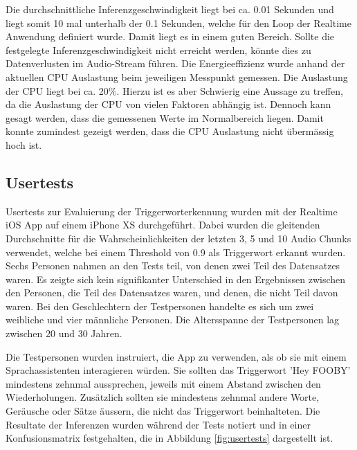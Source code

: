 \documentclass[11pt,a4paper]{article}
\begin{document}
\noindent \newline
Die durchschnittliche Inferenzgeschwindigkeit liegt bei ca. 0.01 Sekunden und liegt somit 10 mal
unterhalb der 0.1 Sekunden, welche für den Loop der Realtime Anwendung definiert wurde. Damit liegt 
es in einem guten Bereich. Sollte die festgelegte Inferenzgeschwindigkeit nicht erreicht werden, 
könnte dies zu Datenverlusten im Audio-Stream führen. Die Energieeffizienz wurde anhand der 
aktuellen CPU Auslastung beim jeweiligen Messpunkt gemessen. Die Auslastung der CPU liegt bei ca. 
20\%. Hierzu ist es aber Schwierig eine Aussage zu treffen, da die Auslastung der CPU von vielen 
Faktoren abhängig ist. Dennoch kann gesagt werden, dass die gemessenen Werte im Normalbereich 
liegen. Damit konnte zumindest gezeigt werden, dass die CPU Auslastung nicht übermässig hoch ist. 

\subsection{Usertests}
Usertests zur Evaluierung der Triggerworterkennung wurden mit der Realtime iOS App auf einem iPhone 
XS durchgeführt. Dabei wurden die gleitenden Durchschnitte für die Wahrscheinlichkeiten der letzten 
3, 5 und 10 Audio Chunks verwendet, welche bei einem Threshold von 0.9 als Triggerwort erkannt 
wurden. Sechs Personen nahmen an den Tests teil, von denen zwei Teil des Datensatzes waren. 
Es zeigte sich kein signifikanter Unterschied in den Ergebnissen zwischen den Personen, die Teil des 
Datensatzes waren, und denen, die nicht Teil davon waren. Bei den Geschlechtern der Testpersonen 
handelte es sich um zwei weibliche und vier männliche Personen. Die Altersspanne der Testpersonen 
lag zwischen 20 und 30 Jahren.

\noindent \newline
Die Testpersonen wurden instruiert, die App zu verwenden, als ob sie mit einem Sprachassistenten 
interagieren würden. Sie sollten das Triggerwort 'Hey FOOBY' mindestens zehnmal aussprechen, 
jeweils mit einem Abstand zwischen den Wiederholungen. Zusätzlich sollten sie mindestens zehnmal 
andere Worte, Geräusche oder Sätze äussern, die nicht das Triggerwort beinhalteten. Die Resultate 
der Inferenzen wurden während der Tests notiert und in einer Konfusionsmatrix festgehalten, die in 
Abbildung \ref{fig:usertests} dargestellt ist.
\end{document}
